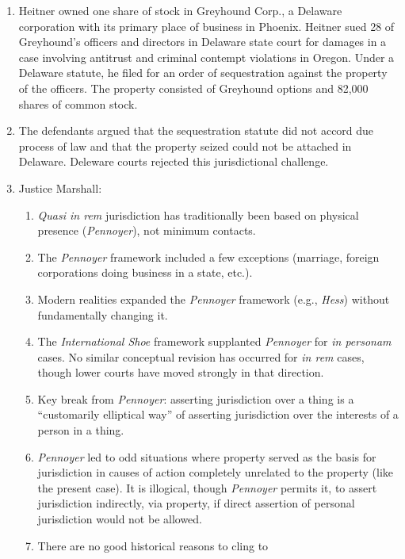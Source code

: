 \begin{enumerate}
    \item Heitner owned one share of stock in Greyhound Corp., a
    Delaware corporation with its primary place of business in Phoenix.
    Heitner sued 28 of Greyhound's officers and directors in Delaware state court for 
    damages in a case involving antitrust and criminal contempt violations in 
    Oregon. Under a Delaware statute, he filed for an order of sequestration 
    against
    the property of the officers. The property consisted of Greyhound
    options and 82,000 shares of common stock.
    \item The defendants argued that the sequestration statute did not accord 
    due
    process of law and that the property seized could not be attached in
    Delaware. Deleware courts rejected this jurisdictional challenge.
    \item Justice Marshall:
    \begin{enumerate}
        \item \emph{Quasi in rem} jurisdiction has traditionally been based on 
        physical presence (\emph{Pennoyer}), not minimum contacts.
        \item The \emph{Pennoyer} framework included a few exceptions 
        (marriage, foreign corporations doing business in a state, etc.).
        \item Modern realities expanded the \emph{Pennoyer} framework (e.g., 
        \emph{Hess}) without fundamentally changing it.
        \item The \emph{International Shoe} framework supplanted 
        \emph{Pennoyer} for \emph{in personam} cases. No similar conceptual 
        revision has occurred for \emph{in rem} cases, though lower courts 
        have moved strongly in that direction.
        \item Key break from \emph{Pennoyer}: asserting jurisdiction over a 
        thing is a ``customarily elliptical way'' of asserting jurisdiction 
        over the interests of a person in a thing.
        \item \emph{Pennoyer} led to odd situations where property served as 
        the basis for jurisdiction in causes of action completely unrelated to 
        the property (like the present case). It is illogical, though 
        \emph{Pennoyer} permits it, to assert jurisdiction indirectly, via 
        property, if direct assertion of personal jurisdiction would not be 
        allowed.
        \item There are no good historical reasons to cling to 

\end{enumerate}
\end{enumerate}
